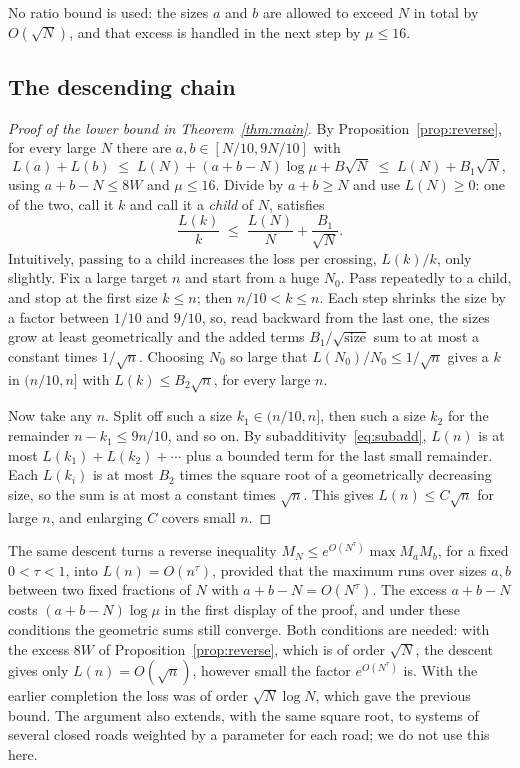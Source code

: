 No ratio bound is used: the sizes $a$ and $b$ are allowed to exceed $N$ in total by $O(\sqrt N)$, and
that excess is handled in the next step by $\mu\le16$.

\subsection{The descending chain}\label{sec:descent}

\begin{proof}[Proof of the lower bound in Theorem~\ref{thm:main}]
By Proposition~\ref{prop:reverse}, for every large $N$ there are $a,b\in[N/10,9N/10]$ with
\[ L(a)+L(b)\;\le\;L(N)+(a+b-N)\log\mu+B\sqrt N\;\le\;L(N)+B_1\sqrt N , \]
using $a+b-N\le8W$ and $\mu\le16$. Divide by $a+b\ge N$ and use $L(N)\ge0$: one of the two, call it
$k$ and call it a \emph{child} of $N$, satisfies
\begin{equation}\label{eq:child}
\frac{L(k)}{k}\;\le\;\frac{L(N)}{N}+\frac{B_1}{\sqrt N}.
\end{equation}
Intuitively, passing to a child increases the loss per crossing, $L(k)/k$, only slightly. Fix a large target $n$ and start
from a huge $N_0$. Pass repeatedly to a child, and stop at the first size $k\le n$; then
$n/10<k\le n$. Each step
shrinks the size by a factor between $1/10$ and $9/10$, so, read backward from the last one, the
sizes grow at least geometrically and the added terms $B_1/\sqrt{\text{size}}$ sum to at most a
constant times $1/\sqrt n$. Choosing $N_0$ so large that $L(N_0)/N_0\le1/\sqrt n$ gives a $k$ in
$(n/10,n]$ with $L(k)\le B_2\sqrt n$, for every large $n$.

Now take any $n$. Split off such a size $k_1\in(n/10,n]$, then such a size $k_2$ for the remainder
$n-k_1\le9n/10$, and so on. By subadditivity~\eqref{eq:subadd}, $L(n)$ is at most
$L(k_1)+L(k_2)+\cdots$ plus a bounded term for the last small remainder. Each $L(k_i)$ is at most
$B_2$ times the square root of a geometrically decreasing size, so the sum is at most a constant
times $\sqrt n$. This gives
$L(n)\le C\sqrt n$ for large $n$, and enlarging $C$ covers small $n$.
\end{proof}

The same descent turns a reverse inequality $M_N\le e^{O(N^\tau)}\max M_aM_b$, for a fixed
$0<\tau<1$, into $L(n)=O(n^\tau)$, provided that the maximum runs over sizes $a,b$ between two fixed
fractions of $N$ with $a+b-N=O(N^\tau)$. The excess $a+b-N$ costs $(a+b-N)\log\mu$ in the first
display of the proof, and under these conditions the geometric sums still converge. Both conditions
are needed: with the excess $8W$ of Proposition~\ref{prop:reverse}, which is of order $\sqrt N$, the
descent gives only $L(n)=O(\sqrt n)$, however small the factor $e^{O(N^\tau)}$ is. With the earlier
completion the loss was
of order $\sqrt N\log N$, which gave the previous bound. The argument also extends, with the same
square root, to systems of several closed roads weighted by a parameter for each road; we do not use
this here.
